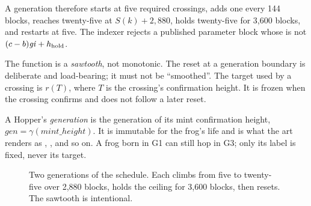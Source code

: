 A generation therefore starts at five required crossings, adds one every 144
blocks, reaches twenty-five at $S(k)+2{,}880$, holds twenty-five for 3{,}600
blocks, and restarts at five. The indexer rejects a published parameter block
whose  is not
$(c-b)\mathit{gi}+h_{\rm hold}$.

The function is a \emph{sawtooth}, not monotonic. The reset at a generation
boundary is deliberate and load-bearing; it must not be ``smoothed''. The
target used by a crossing is $r(T)$, where $T$ is the crossing's confirmation
height. It is frozen when the crossing confirms and does not follow a later
reset.

A Hopper's \emph{generation} is the generation of its mint confirmation
height, $\mathit{gen}=\gamma(\mathit{mint\_height})$. It is immutable for the
frog's life and is what the art renders as , , and so on. A
frog born in G1 can still hop in G3; only its label is fixed, never its
target.

\begin{figure}[htbp]
\centering
{}
\caption{Two generations of the schedule. Each climbs from five to
twenty-five over 2{,}880 blocks, holds the ceiling for 3{,}600 blocks, then
resets. The sawtooth is intentional.}
\label{fig:generation}
\end{figure}

